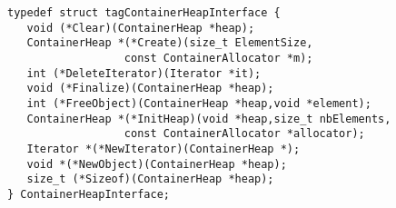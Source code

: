 \begin{verbatim}
typedef struct tagContainerHeapInterface {
   void (*Clear)(ContainerHeap *heap);
   ContainerHeap *(*Create)(size_t ElementSize,
                  const ContainerAllocator *m);
   int (*DeleteIterator)(Iterator *it);
   void (*Finalize)(ContainerHeap *heap);
   int (*FreeObject)(ContainerHeap *heap,void *element);
   ContainerHeap *(*InitHeap)(void *heap,size_t nbElements,
                  const ContainerAllocator *allocator);
   Iterator *(*NewIterator)(ContainerHeap *);
   void *(*NewObject)(ContainerHeap *heap);
   size_t (*Sizeof)(ContainerHeap *heap);
} ContainerHeapInterface;
\end{verbatim}
